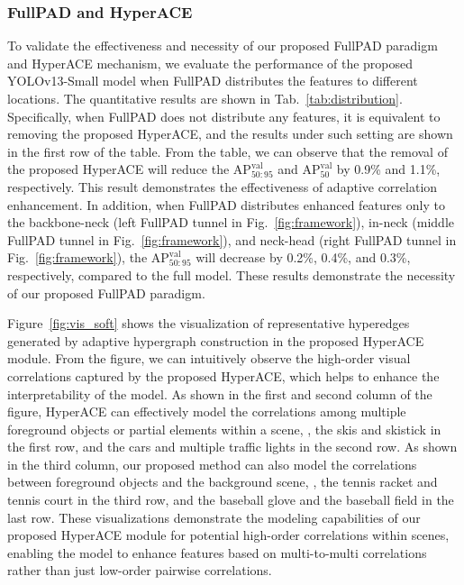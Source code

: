\subsubsection{FullPAD and HyperACE} To validate the effectiveness and necessity of our proposed FullPAD paradigm and HyperACE mechanism, we evaluate the performance of the proposed YOLOv13-Small model when FullPAD distributes the features to different locations. The quantitative results are shown in Tab.~\ref{tab:distribution}. Specifically, when FullPAD does not distribute any features, it is equivalent to removing the proposed HyperACE, and the results under such setting are shown in the first row of the table. From the table, we can observe that the removal of the proposed HyperACE will reduce the $\text{AP}_{50:95}^\text{val}$ and $\text{AP}_{50}^\text{val}$ by 0.9\% and 1.1\%, respectively. This result demonstrates the effectiveness of adaptive correlation enhancement. In addition, when FullPAD distributes enhanced features only to the backbone-neck (left FullPAD tunnel in Fig.~\ref{fig:framework}), in-neck (middle FullPAD tunnel in Fig.~\ref{fig:framework}), and neck-head (right FullPAD tunnel in Fig.~\ref{fig:framework}), the $\text{AP}_{50:95}^\text{val}$ will decrease by 0.2\%, 0.4\%, and 0.3\%, respectively, compared to the full model. These results demonstrate the necessity of our proposed FullPAD paradigm.






Figure~\ref{fig:vis_soft} shows the visualization of representative hyperedges generated by adaptive hypergraph construction in the proposed HyperACE module. From the figure, we can intuitively observe the high-order visual correlations captured by the proposed HyperACE, which helps to enhance the interpretability of the model. As shown in the first and second column of the figure, HyperACE can effectively model the correlations among multiple foreground objects or partial elements within a scene, \eg, the skis and skistick in the first row, and the cars and multiple traffic lights in the second row. As shown in the third column, our proposed method can also model the correlations between foreground objects and the background scene, \eg, the tennis racket and tennis court in the third row, and the baseball glove and the baseball field in the last row. These visualizations demonstrate the modeling capabilities of our proposed HyperACE module for potential high-order correlations within scenes, enabling the model to enhance features based on multi-to-multi correlations rather than just low-order pairwise correlations.




